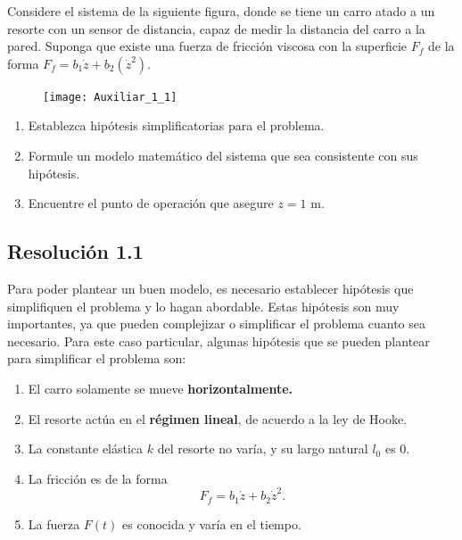 \documentclass[
  11pt,
  letterpaper,
   addpoints,
   answers
  ]{exam}
\begin{document}
\begin{questions}
    \question Considere el sistema de la siguiente figura, donde se tiene un carro atado a un resorte con un sensor de distancia, capaz de medir la distancia del carro a la pared. Suponga que existe una fuerza de fricción viscosa con la superficie $F_f$ de la forma $F_f = b_1 \dot{z} + b_2 (\dot{z}^2)$.
    \begin{figure}[ht]
        \centering
        \texttt{[image: Auxiliar\_1\_1]}
    \end{figure}
    \begin{enumerate}
        \item Establezca hipótesis simplificatorias para el problema.
        \item Formule un modelo matemático del sistema que sea consistente con sus hipótesis.
        \item Encuentre el punto de operación que asegure $z = 1$ m.
    \end{enumerate}
    \begin{solution}
    \subsection*{Resolución 1.1}
        Para poder plantear un buen modelo, es necesario establecer hipótesis que simplifiquen el problema y lo hagan abordable. Estas hipótesis son muy importantes, ya que pueden complejizar o simplificar el problema cuanto sea necesario. Para este caso particular, algunas hipótesis que se pueden plantear para simplificar el problema son:
\begin{enumerate}
    \item El carro solamente se mueve \textbf{horizontalmente.}
    \item El resorte actúa en el \textbf{régimen lineal}, de acuerdo a la ley de Hooke.
    \item La constante elástica $k$ del resorte no varía, y su largo natural $l_0$ es 0.
    \item La fricción es de la forma 
    \begin{equation}
        F_f = b_1 \dot{z} + b_2 \dot{z}^2.
    \end{equation}
    \item La fuerza $F(t)$ es conocida y varía en el tiempo.
\end{enumerate}

\end{solution}
\end{questions}
\end{document}
